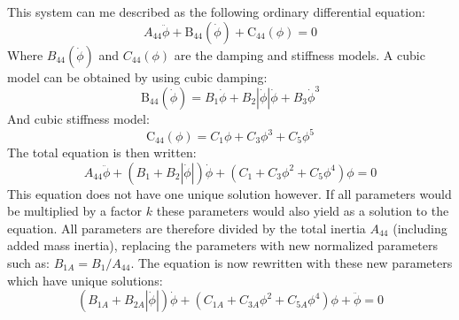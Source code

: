 This system can me described as the following ordinary differential
equation:
\begin{equation}
A_{44} \ddot{\phi} + \operatorname{B_{44}}{\left(\dot{\phi} \right)} + \operatorname{C_{44}}{\left(\phi \right)} = 0
\label{eq:roll_decay_equation_general_himeno}
\end{equation}
Where $B_{44}(\dot{\phi})$ and $C_{44}(\phi)$ are the damping and
stiffness models. A cubic model can be obtained by using cubic damping:
\begin{equation}
\operatorname{B_{44}}{\left(\dot{\phi} \right)} = B_{1} \dot{\phi} + B_{2} \left|{\dot{\phi}}\right| \dot{\phi} + B_{3} \dot{\phi}^{3}
\label{eq:b44_cubic_equation}
\end{equation}
And cubic stiffness model:
\begin{equation}
\operatorname{C_{44}}{\left(\phi \right)} = C_{1} \phi + C_{3} \phi^{3} + C_{5} \phi^{5}
\label{eq:restoring_equation_cubic}
\end{equation}
The total equation is then written:
\begin{equation}
A_{44} \ddot{\phi} + \left(B_{1} + B_{2} \left|{\dot{\phi}}\right|\right) \dot{\phi} + \left(C_{1} + C_{3} \phi^{2} + C_{5} \phi^{4}\right) \phi = 0
\label{eq:roll_decay_equation_quadratic}
\end{equation}
This equation does not have one unique solution however. If all
parameters would be multiplied by a factor $k$ these parameters would
also yield as a solution to the equation. All parameters are therefore
divided by the total inertia $A_{44}$ (including added mass inertia),
replacing the parameters with new normalized parameters such as:
$B_{1A} = B_1/A_{44}$. The equation is now rewritten with these new
parameters which have unique solutions:
\begin{equation}
\left(B_{1A} + B_{2A} \left|{\dot{\phi}}\right|\right) \dot{\phi} + \left(C_{1A} + C_{3A} \phi^{2} + C_{5A} \phi^{4}\right) \phi + \ddot{\phi} = 0
\label{eq:roll_decay_equation_quadratic_A}
\end{equation}

